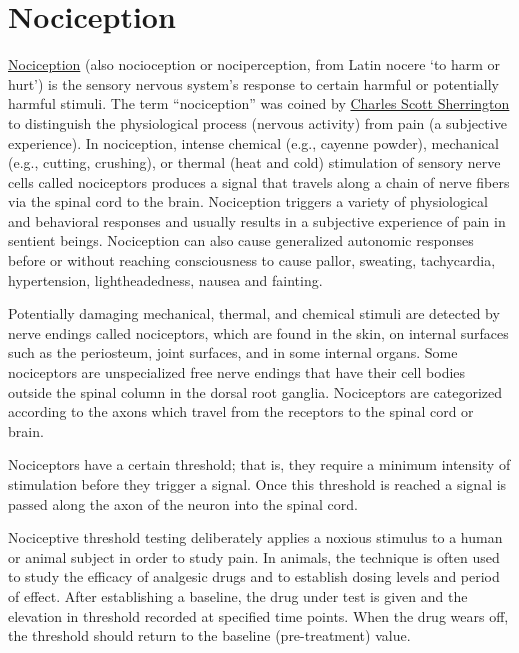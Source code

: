 \hypertarget{nociception}{%
\section{Nociception}\label{nociception}}

\href{https://en.wikipedia.org/wiki/Nociception}{Nociception} (also nocioception or nociperception, from Latin nocere `to harm or hurt') is the sensory nervous system's response to certain harmful or potentially harmful stimuli. The term ``nociception'' was coined by \href{https://en.wikipedia.org/wiki/Charles_Scott_Sherrington}{Charles Scott Sherrington} to distinguish the physiological process (nervous activity) from pain (a subjective experience). In nociception, intense chemical (e.g., cayenne powder), mechanical (e.g., cutting, crushing), or thermal (heat and cold) stimulation of sensory nerve cells called nociceptors produces a signal that travels along a chain of nerve fibers via the spinal cord to the brain. Nociception triggers a variety of physiological and behavioral responses and usually results in a subjective experience of pain in sentient beings. Nociception can also cause generalized autonomic responses before or without reaching consciousness to cause pallor, sweating, tachycardia, hypertension, lightheadedness, nausea and fainting.

Potentially damaging mechanical, thermal, and chemical stimuli are detected by nerve endings called nociceptors, which are found in the skin, on internal surfaces such as the periosteum, joint surfaces, and in some internal organs. Some nociceptors are unspecialized free nerve endings that have their cell bodies outside the spinal column in the dorsal root ganglia. Nociceptors are categorized according to the axons which travel from the receptors to the spinal cord or brain.

Nociceptors have a certain threshold; that is, they require a minimum intensity of stimulation before they trigger a signal. Once this threshold is reached a signal is passed along the axon of the neuron into the spinal cord.

Nociceptive threshold testing deliberately applies a noxious stimulus to a human or animal subject in order to study pain. In animals, the technique is often used to study the efficacy of analgesic drugs and to establish dosing levels and period of effect. After establishing a baseline, the drug under test is given and the elevation in threshold recorded at specified time points. When the drug wears off, the threshold should return to the baseline (pre-treatment) value.

